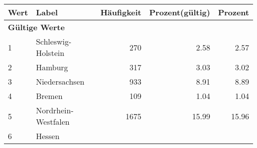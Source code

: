      \begin{longtable}{lXrrr}
     \toprule
     \textbf{Wert} & \textbf{Label} & \textbf{Häufigkeit} & \textbf{Prozent(gültig)} & \textbf{Prozent} \\
     \endhead
     \midrule
     \multicolumn{5}{l}{\textbf{Gültige Werte}}\\

     1 &
     \multicolumn{1}{X}{ Schleswig-Holstein   } &


       \num{270} &
       \num[round-mode=places,round-precision=2]{2.58} &
         \num[round-mode=places,round-precision=2]{2.57} \\

     2 &
     \multicolumn{1}{X}{ Hamburg   } &


       \num{317} &
       \num[round-mode=places,round-precision=2]{3.03} &
         \num[round-mode=places,round-precision=2]{3.02} \\

     3 &
     \multicolumn{1}{X}{ Niedersachsen   } &


       \num{933} &
       \num[round-mode=places,round-precision=2]{8.91} &
         \num[round-mode=places,round-precision=2]{8.89} \\

     4 &
     \multicolumn{1}{X}{ Bremen   } &


       \num{109} &
       \num[round-mode=places,round-precision=2]{1.04} &
         \num[round-mode=places,round-precision=2]{1.04} \\

     5 &
     \multicolumn{1}{X}{ Nordrhein-Westfalen   } &


       \num{1675} &
       \num[round-mode=places,round-precision=2]{15.99} &
         \num[round-mode=places,round-precision=2]{15.96} \\

     6 &
     \multicolumn{1}{X}{ Hessen   } &



\end{longtable}

